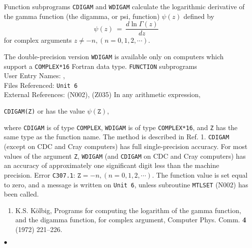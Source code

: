                       
                 
\Submitter{  }                        
                 
Function subprograms {\tt CDIGAM} and {\tt WDIGAM} calculate
the logarithmic derivative of the gamma function
(the digamma, or psi, function)
$\psi(z)$ defined by
$$ \psi (z) \ = \  \frac{d \ln \Gamma(z)}{dz} $$
for complex arguments $z \neq -n,(n = 0,1,2,\cdots)$.
\par
The double-precision version {\tt WDIGAM} is available only on computers
which support a {\tt COMPLEX*16} Fortran data type.
\Structure
{\tt FUNCTION} subprograms \\
User Entry Names: ,   \\
Files Referenced: {\tt Unit 6} \\
External References:  (N002),  (Z035)
\Usage
In any arithmetic expression,
\begin{center}
{\tt CDIGAM(Z)} \quad or  \quad has the value \quad
$\psi(\mathtt{Z})$,
\end{center}
where {\tt CDIGAM} is of type {\tt COMPLEX}, {\tt WDIGAM} is of type
{\tt COMPLEX*16}, and {\tt Z} has the same type as the function name.
\Method
The method is described in Ref. 1.
\Accuracy
{\tt CDIGAM} (except on CDC and Cray computers)
has full single-precision accuracy.
For most values of the argument {\tt Z}, {\tt WDIGAM}
(and {\tt CDIGAM} on CDC and Cray computers) has an accuracy of
approximately one significant digit less than the machine precision.
\Errorh
Error {\tt C307.1}: $\mathtt{Z} = -n,(n = 0,1,2,\cdots).$
The function value is set equal to zero, and a message is written on
{\tt Unit 6}, unless subroutine {\tt MTLSET} (N002) has been called.
\Refer
\begin{enumerate}
\item K.S. K\"olbig, Programs for computing the
logarithm of the gamma function, and the digamma function, for
complex argument, Computer Phys. Comm. {\bf 4} (1972) 221--226.
\end{enumerate}
$\bullet$
